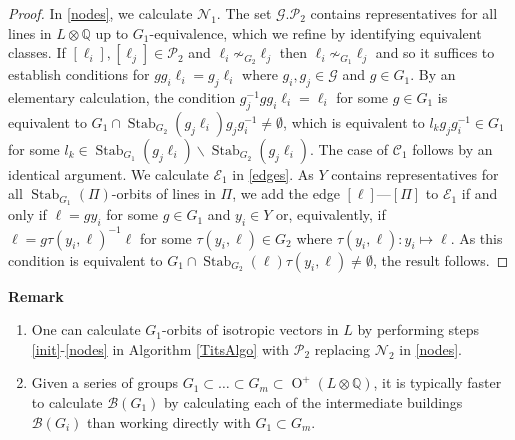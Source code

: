 \documentclass[12pt, a4paper]{article}
\newcommand{\QQ}{\mathbb{Q}}
\newcommand{\bc}{\mathcal{B}}
\newcommand{\cc}{\mathcal{C}}
\newcommand{\ec}{\mathcal{E}}
\newcommand{\gc}{\mathcal{G}}
\newcommand{\nc}{\mathcal{N}}
\newcommand{\pc}{\mathcal{P}}
\newcommand{\opn}{\operatorname}
\begin{document}
\begin{proof}
  In \ref{nodes}, we calculate $\nc_1$.
  The set $\gc.\pc_2$ contains representatives for all lines in $L \otimes \QQ$ up to $G_1$-equivalence, which we refine by identifying equivalent classes.
  If $[\ell_i], [\ell_j] \in \pc_2$ and $\ell_i \not \sim_{G_2} \ell_j$ then $\ell_i \not \sim_{G_1} \ell_j$ and so it suffices to establish conditions for $g g_i \ell_i = g_j \ell_i$ where $g_i, g_j \in \gc$ and $g \in G_1$.
  By an elementary calculation, the condition $g_j^{-1} g g_i \ell_i = \ell_i$ for some $g \in G_1$ is equivalent to $G_1 \cap \opn{Stab}_{G_2}(g_j \ell_i) g_j g_i^{-1} \neq \emptyset$, which is equivalent to $l_k g_j g_i^{-1} \in G_1$ for some $l_k \in \opn{Stab}_{G_1}(g_j \ell_i) \backslash \opn{Stab}_{G_2}(g_j \ell_i)$.
  The case of $\cc_1$ follows by an identical argument.
We calculate $\ec_1$ in \ref{edges}.
  As $Y$ contains representatives for all $\opn{Stab}_{G_1}(\Pi)$-orbits of lines in $\Pi$, we add the edge $[\ell]$---$[\Pi]$ to $\ec_1$ if and only if $\ell = g y_i$ for some $g \in G_1$ and $y_i \in Y$ or, equivalently, if $\ell = g \tau(y_i, \ell)^{-1} \ell$ for some $\tau(y_i, \ell) \in G_2$ where $\tau(y_i, \ell): y_i \mapsto \ell$.
  As this condition is equivalent to $G_1 \cap \opn{Stab}_{G_2}(\ell) \tau(y_i, \ell) \neq \emptyset$, the result follows.  
\end{proof}
\noindent \textbf{Remark} 
\begin{enumerate}
\item One can calculate  $G_1$-orbits of isotropic vectors in $L$ by performing steps \ref{init}-\ref{nodes} in Algorithm \ref{TitsAlgo} with $\pc_2$ replacing $\nc_2$ in \ref{nodes}.
\item Given a series of groups 
$G_1 \subset \ldots \subset G_m \subset \opn{O}^+(L \otimes \QQ)$,
  it is typically faster to calculate $\bc(G_1)$ by calculating each of the intermediate buildings $\bc(G_i)$ than working directly with $G_1 \subset G_m$.
\end{enumerate}
\end{document}

